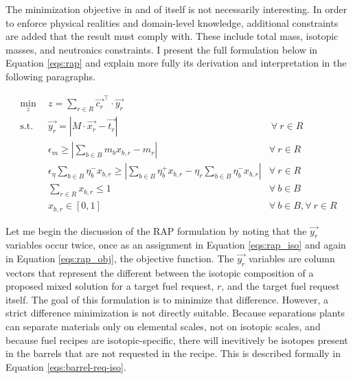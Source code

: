 The minimization objective in and of itself is not necessarily interesting. In
order to enforce physical realities and domain-level knowledge, additional
constraints are added that the result must comply with. These include total
mass, isotopic masses, and neutronics constraints. I present the full
formulation below in Equation \ref{eqs:rap} and explain more fully its
derivation and interpretation in the following paragraphs.

\begin{subequations}\label{eqs:rap}
  \begin{align}
    \min_{z} \:\: & 
    z = \sum_{r \in R} \vec{c_{r}}^{\top} \cdot \vec{y_{r}}
    & \label{eqs:rap_obj} \\
    \text{s.t.} \:\: &
    \vec{y_{r}} = \left| M \cdot \vec{x_{r}}  - \vec{t_{r}} \right|
    &
    \: \forall \: r \in R \label{eqs:rap_iso} \\
    &
    \epsilon_{m} \geq \left| \sum_{b \in B} m_{b} x_{b,r} - m_{r} \right|
    & 
    \forall \: r \in R \label{eqs:rap_mass} \\
    &
    \epsilon_{\eta} \sum_{b \in B} \eta_{b}^{-} x_{b,r} \geq 
    \left| \sum_{b \in B} \eta_{b}^{+} x_{b,r} - 
           \eta_{r} \sum_{b \in B} \eta_{b}^{-} x_{b,r} \right|
    & 
    \forall \: r \in R \label{eqs:rap_eta} \\
    &
    \sum_{r \in R} x_{b,r} \leq 1
    & 
    \forall \: b \in B \label{eqs:rap_conserv} \\
    &
    x_{b,r} \in \left[ 0, 1 \right]
    & 
    \forall \: b \in B, \forall \: r \in R  \label{eqs:rap_x}
  \end{align}
\end{subequations}

Let me begin the discussion of the RAP formulation by noting that the
$\vec{y_{r}}$ variables occur twice, once as an assignment in
Equation \ref{eqs:rap_iso} and again in Equation \ref{eqs:rap_obj}, the
objective function. The $\vec{y_{r}}$ variables are column vectors that
represent the different between the isotopic composition of a proposed mixed
solution for a target fuel request, $r$, and the target fuel request itself. The
goal of this formulation is to minimize that difference. However, a strict
difference minimization is not directly suitable. Because separations plants can
separate materials only on elemental scales, not on isotopic scales, and because
fuel recipes are isotopic-specific, there will inevitively be isotopes present
in the barrels that are not requested in the recipe. This is described formally
in Equation \ref{eqs:barrel-req-iso}.

